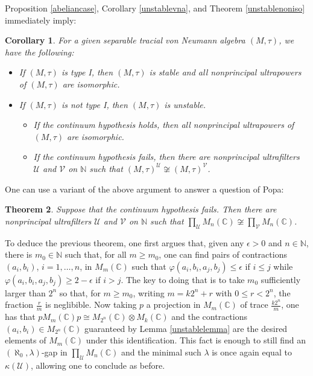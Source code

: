 \documentclass[12pt]{amsart}
\newtheorem{thm}{Theorem}[section]
\newtheorem{cor}[thm]{Corollary}
\theoremstyle{definition}
\def\bb{\mathbb}
\def\bb{\mathbb}
\def\cal{\mathcal}
\def\u{\mathsf 1}
\def \u{\mathcal U}
\begin{document}
Proposition \ref{abeliancase}, Corollary \ref{unstablevna}, and Theorem \ref{unstablenoniso} immediately imply:

\begin{cor}
For a given separable tracial von Neumann algebra $(M,\tau)$, we have the following:
\begin{itemize}
    \item If $(M,\tau)$ is type I, then $(M,\tau)$ is stable and all nonprincipal ultrapowers of $(M,\tau)$ are isomorphic.
    \item If $(M,\tau)$ is not type I, then $(M,\tau)$ is unstable.
    \begin{itemize}
    \item If the continuum hypothesis holds, then all nonprincipal ultrapowers of $(M,\tau)$ are isomorphic.
        \item If the continuum hypothesis fails, then there are nonprincipal ultrafilters $\u$ and $\cal V$ on $\bb N$ such that $(M,\tau)^\u\not\cong (M,\tau)^{\cal V}$.
    \end{itemize}
\end{itemize}
\end{cor}

One can use a variant of the above argument to answer a question of Popa:

\begin{thm}\label{popanoniso}
Suppose that the continuum hypothesis fails.  Then there are nonprincipal ultrafilters $\u$ and $\cal V$ on $\bb N$ such that $\prod_\u M_n(\bb C)\not\cong \prod_{\cal V}M_n(\bb C)$.
\end{thm}

To deduce the previous theorem, one first argues that, given any $\epsilon>0$ and $n\in \bb N$, there is $m_0\in \bb N$ such that, for all $m\geq m_0$, one can find pairs of contractions $(a_i,b_i)$, $i=1,\ldots,n$, in $M_m(\bb C)$ such that $\varphi(a_i,b_i,a_j,b_j)\leq \epsilon$ if $i\leq j$ while $\varphi(a_i,b_i,a_j,b_j)\geq 2-\epsilon$ if $i>j$.  The key to doing that is to take $m_0$ sufficiently larger than $2^n$ so that, for $m\geq m_0$, writing $m=k2^n+r$ with $0\leq r<2^n$, the fraction $\frac{r}{m}$ is neglibible.  Now taking $p$ a projection in $M_m(\bb C)$ of trace $\frac{k2^n}{m}$, one has that $pM_m(\bb C)p\cong M_{2^n}(\bb C)\otimes M_k(\bb C)$ and the contractions $(a_i,b_i)\in M_{2^n}(\bb C)$ guaranteed by Lemma \ref{unstablelemma} are the desired elements of $M_m(\bb C)$ under this identification.  This fact is enough to still find an $(\aleph_0,\lambda)$-gap in $\prod_\u M_n(\bb C)$ and the minimal such $\lambda$ is once again equal to $\kappa(\u)$, allowing one to conclude as before.
\end{document}
